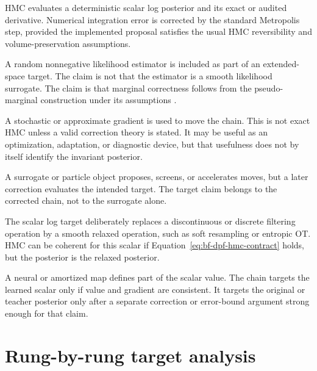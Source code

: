 \begin{description}[leftmargin=0.18\textwidth, style=nextline]
  \item[Exact-likelihood HMC]
  HMC evaluates a deterministic scalar log posterior and its exact or audited
  derivative.  Numerical integration error is corrected by the standard
  Metropolis step, provided the implemented proposal satisfies the usual
  HMC reversibility and volume-preservation assumptions.

  \item[Pseudo-marginal MCMC]
  A random nonnegative likelihood estimator is included as part of an
  extended-space target.  The claim is not that the estimator is a smooth
  likelihood surrogate.  The claim is that marginal correctness follows from
  the pseudo-marginal construction under its assumptions
  \citep{andrieu2009pseudo,andrieu2010particle}.

  \item[Noisy-gradient method]
  A stochastic or approximate gradient is used to move the chain.  This is not
  exact HMC unless a valid correction theory is stated.  It may be useful as an
  optimization, adaptation, or diagnostic device, but that usefulness does not
  by itself identify the invariant posterior.

  \item[Delayed-acceptance or surrogate-corrected MCMC]
  A surrogate or particle object proposes, screens, or accelerates moves, but a
  later correction evaluates the intended target.  The target claim belongs to
  the corrected chain, not to the surrogate alone.

  \item[Relaxed-target HMC]
  The scalar log target deliberately replaces a discontinuous or discrete
  filtering operation by a smooth relaxed operation, such as soft resampling or
  entropic OT.  HMC can be coherent for this scalar if
  Equation~\eqref{eq:bf-dpf-hmc-contract} holds, but the posterior is the
  relaxed posterior.

  \item[Learned-surrogate HMC]
  A neural or amortized map defines part of the scalar value.  The chain targets
  the learned scalar only if value and gradient are consistent.  It targets the
  original or teacher posterior only after a separate correction or error-bound
  argument strong enough for that claim.
\end{description}

\section{Rung-by-rung target analysis}
\label{sec:bf-dpf-hmc-rung-analysis}

